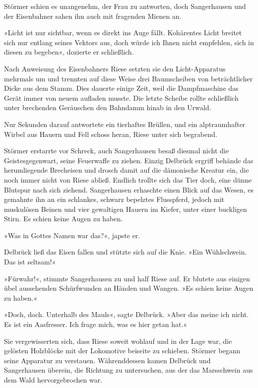 Störmer schien es unangenehm, der Frau zu antworten, doch
Sangerhausen und der Eisenbahner sahen ihn auch mit fragenden
Mienen an.

»Licht ist nur sichtbar, wenn es direkt ins Auge fällt. Kohärentes
Licht breitet sich nur entlang seines Vektors aus, doch würde ich
Ihnen nicht empfehlen, sich in diesen zu begeben«, dozierte er
schließlich.

Nach Anweisung des Eisenbahners Riese setzten sie den
Licht-Apparatus mehrmals um und trennten auf diese Weise drei
Baumscheiben von beträchtlicher Dicke aus dem Stamm. Dies dauerte
einige Zeit, weil die Dampfmaschine das Gerät immer von neuem
aufladen musste. Die letzte Scheibe rollte schließlich unter
brechenden Geräuschen den Bahndamm hinab in den Urwald.

Nur Sekunden darauf antwortete ein tierhaftes Brüllen, und ein
alptraumhafter Wirbel aus Hauern und Fell schoss heran, Riese unter
sich begrabend.

Störmer erstarrte vor Schreck, auch Sangerhausen besaß diesmal
nicht die Geistesgegenwart, seine Feuerwaffe zu ziehen. Einzig
Delbrück ergriff behände das herumliegende Brecheisen und drosch
damit auf die dämonische Kreatur ein, die noch immer nicht von
Riese abließ. Endlich trollte sich das Tier doch, eine dünne
Blutspur nach sich ziehend. Sangerhausen erhaschte einen Blick auf
das Wesen, es gemahnte ihn an ein schlankes, schwarz bepelztes
Flusspferd, jedoch mit muskulösen Beinen und vier gewaltigen Hauern
im Kiefer, unter einer buckligen Stirn. Es schien keine Augen zu
haben.

»Was in Gottes Namen war das?«, japste er.

Delbrück ließ das Eisen fallen und stützte sich auf die Knie. »Ein
Wühlschwein. Das ist seltsam!«

»Fürwahr!«, stimmte Sangerhausen zu und half Riese auf. Er blutete
aus einigen übel aussehenden Schürfwunden an Händen und Wangen. »Es
schien keine Augen zu haben.«

»Doch, doch. Unterhalb des Mauls«, sagte Delbrück. »Aber das meine
ich nicht. Es ist ein Aasfresser. Ich frage mich, was es hier getan
hat.«

Sie vergewisserten sich, dass Riese soweit wohlauf und in der Lage
war, die gelösten Holzblöcke mit der Lokomotive beiseite zu
schieben. Störmer begann seine Apparatur zu verstauen.
Währenddessen kamen Delbrück und Sangerhausen überein, die Richtung
zu untersuchen, aus der das Marsschwein aus dem Wald
hervorgebrochen war.

